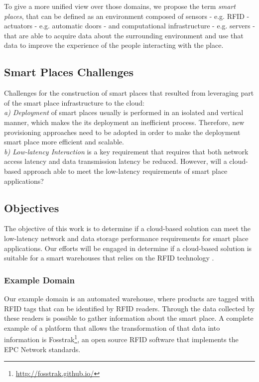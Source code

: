 To give a more unified view over those domains, we propose the term \textit{smart places},
that can be defined as an environment composed of sensors - e.g. RFID - actuators - e.g. automatic
doors - and computational infrastructure - e.g. servers - that are able to acquire data about the
surrounding environment and use that data to improve the experience of the people interacting with
the place.

\subsection{Smart Places Challenges}
\label{sub:challenges}
Challenges \cite{caceres2012ubicomp} for the construction of smart places that resulted from leveraging
part of the smart place infrastructure to the cloud:\\

\textit{a) Deployment} of smart places usually is performed in an isolated and vertical manner, which
makes the its deployment an inefficient process. Therefore, new provisioning approaches need to be
adopted in order to make the deployment smart place more efficient and scalable.\\

\textit{b) Low-latency Interaction} is a key requirement that requires that both network access
latency and data transmission latency be reduced. However, will a cloud-based
approach able to meet the low-latency requirements of smart place applications?\\

\subsection{Objectives}
\label{sub:objectives}
The objective of this work is to determine if a cloud-based solution can meet the low-latency network
and data storage performance requirements for smart place applications. Our efforts will be engaged in
determine if a cloud-based solution is suitable for a smart warehouses that relies on the RFID technology
\cite{want2006introduction}.\\

\subsubsection{Example Domain}
\label{subs:domain}
Our example domain is an automated warehouse, where products are tagged with \gls{RFID} tags that
can be identified by \gls{RFID} readers. Through the data collected by these readers is possible to
gather information about the smart place. A complete example of a platform that allows the transformation
of that data into information is Fosstrak\footnote{\url{http://fosstrak.github.io/}}, an open
source \gls{RFID} software that implements the \gls{EPC} Network standards.\\

